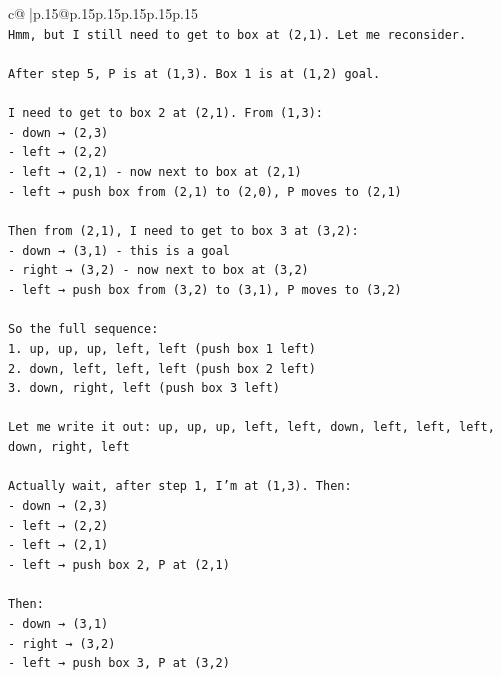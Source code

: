 \documentclass{article}
\begin{document}
{\begin{supertabular}{c@{$\;$}|p{.15\linewidth}@{}p{.15\linewidth}p{.15\linewidth}p{.15\linewidth}p{.15\linewidth}p{.15\linewidth}}
{{{\\ 
\texttt{Hmm, but I still need to get to box at (2,1). Let me reconsider.} \\
\\ 
\texttt{After step 5, P is at (1,3). Box 1 is at (1,2) goal.} \\
\\ 
\texttt{I need to get to box 2 at (2,1). From (1,3):} \\
\texttt{{-} down → (2,3)} \\
\texttt{{-} left → (2,2)} \\
\texttt{{-} left → (2,1) {-} now next to box at (2,1)} \\
\texttt{{-} left → push box from (2,1) to (2,0), P moves to (2,1)} \\
\\ 
\texttt{Then from (2,1), I need to get to box 3 at (3,2):} \\
\texttt{{-} down → (3,1) {-} this is a goal} \\
\texttt{{-} right → (3,2) {-} now next to box at (3,2)} \\
\texttt{{-} left → push box from (3,2) to (3,1), P moves to (3,2)} \\
\\ 
\texttt{So the full sequence:} \\
\texttt{1. up, up, up, left, left (push box 1 left)} \\
\texttt{2. down, left, left, left (push box 2 left)} \\
\texttt{3. down, right, left (push box 3 left)} \\
\\ 
\texttt{Let me write it out: up, up, up, left, left, down, left, left, left, down, right, left} \\
\\ 
\texttt{Actually wait, after step 1, I'm at (1,3). Then:} \\
\texttt{{-} down → (2,3)} \\
\texttt{{-} left → (2,2)} \\
\texttt{{-} left → (2,1)} \\
\texttt{{-} left → push box 2, P at (2,1)} \\
\\ 
\texttt{Then:} \\
\texttt{{-} down → (3,1)} \\
\texttt{{-} right → (3,2)} \\
\texttt{{-} left → push box 3, P at (3,2)} \\
\\ 
}}}
\end{supertabular}}
\end{document}
